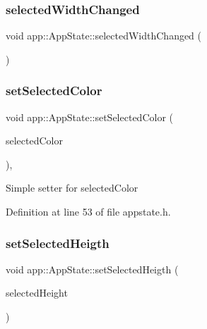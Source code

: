 \subsubsection{\texorpdfstring{selected\+Width\+Changed}{selectedWidthChanged}}
{\footnotesize\ttfamily void app\+::\+App\+State\+::selected\+Width\+Changed (\begin{DoxyParamCaption}\item[{qreal}]{ }\end{DoxyParamCaption})\hspace{0.3cm}{\ttfamily [signal]}}

\mbox{\label{classapp_1_1_app_state_a3e246deb0691d9b0692da546e65c707c}} 
\subsubsection{\texorpdfstring{set\+Selected\+Color}{setSelectedColor}}
{\footnotesize\ttfamily void app\+::\+App\+State\+::set\+Selected\+Color (\begin{DoxyParamCaption}\item[{Q\+Color}]{selected\+Color }\end{DoxyParamCaption})\hspace{0.3cm}{\ttfamily [inline]}, {\ttfamily [slot]}}

Simple setter for selected\+Color 

Definition at line 53 of file appstate.\+h.

\mbox{\label{classapp_1_1_app_state_ad0d673e923cf52550d08741ccfabbccf}} 
\subsubsection{\texorpdfstring{set\+Selected\+Heigth}{setSelectedHeigth}}
{\footnotesize\ttfamily void app\+::\+App\+State\+::set\+Selected\+Heigth (\begin{DoxyParamCaption}\item[{qreal}]{selected\+Height }\end{DoxyParamCaption})\hspace{0.3cm}{\ttfamily [slot]}}

